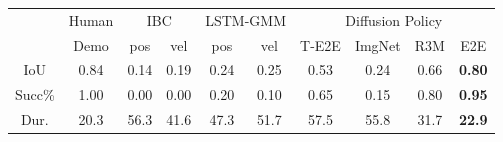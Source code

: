 \setlength\tabcolsep{1.2pt}
\small
\begin{tabular}{c|c|cc|cc|cccc}
\toprule
       & Human & \multicolumn{2}{c|}{IBC} & \multicolumn{2}{c|}{LSTM-GMM} & \multicolumn{4}{c}{Diffusion Policy}     \\
       & Demo  & pos        & vel        & pos          & vel         & T-E2E & ImgNet & R3M & E2E         \\
\midrule
IoU      & 0.84  & 0.14       & 0.19       & 0.24         & 0.25        & 0.53  & 0.24     & 0.66  & \textbf{0.80} \\
Succ\%   & 1.00  & 0.00       & 0.00       & 0.20         & 0.10        & 0.65  & 0.15     & 0.80  & \textbf{0.95} \\
Dur. & 20.3  & 56.3       & 41.6       & 47.3         & 51.7        & 57.5  & 55.8     & 31.7  & \textbf{22.9} \\
\bottomrule

\end{tabular}
